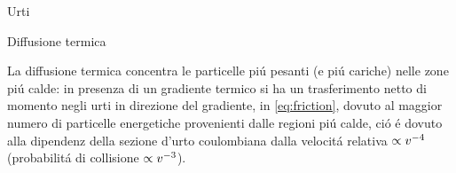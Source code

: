 \begin{frame}{Urti}
\begin{comment}
Considero il problema in cui le due specie hanno velocit\'a relativa media diversa da zero ma piccola rispetto alla velocit\'a termica: nel sistema in cui la prima specie ha velocit\'a media nulla la seconda ha velocit\'a $V_{ij}$ quindi la distribuzione di velocit\'a della prima \'e la distribuzione di equilibrio a temperatura T quella della seconda \'e  la distribuzione di equilibrio a temperatura T traslata di $V_{ij}$, velocit\'a di diffusione:
\begin{equation}
f_j=f_j^{(0)}+\frac{m_j}{KT}(\vec{V}_{ij}\cdot\vec{v}_j)f_j^{(0)}
\end{equation}
da cui si ottiene:
\begin{align}
&\vec{R}_{ij}=n_in_j\mu_{ij}\alpha_{ij}\vec{V}_{ij}\label{eq:resistance}\\
&\alpha_{ij}=\frac{\mu_{ij}}{KT}\int v_r^3\sigma^Tf^{(0)}(\vec{v_r})\,d^3v_r\label{eq:collisionintegral}\\ &\sigma^T=\int(1-\cos{\chi})\,d\sigma\label{eq:sigmatransport}
\end{align}

\end{comment}

\begin{block}{Diffusione termica}

La diffusione termica concentra le particelle pi\'u pesanti (e pi\'u cariche) nelle zone pi\'u calde: in presenza di un gradiente termico si ha un trasferimento netto di momento negli urti in direzione del gradiente, in \eqref{eq:friction}, dovuto al maggior numero di particelle energetiche provenienti dalle regioni pi\'u calde, ci\'o \'e dovuto alla dipendenz della sezione d'urto coulombiana dalla velocit\'a relativa $\propto v^{-4}$ (probabilit\'a di collisione $\propto v^{-3}$).

\end{block}

\end{frame}

